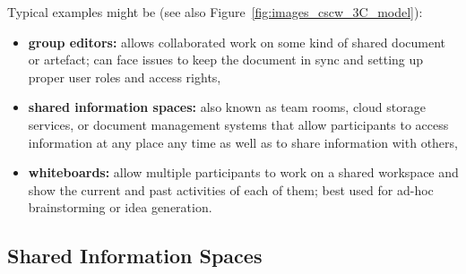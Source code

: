 Typical examples might be (see also Figure~\ref{fig:images_cscw_3C_model}):

\begin{itemize}
  \item \textbf{group editors:} allows collaborated work on some kind of shared document or artefact; can face issues to keep the document in sync and setting up proper user roles and access rights,
  \item \textbf{shared information spaces:} also known as team rooms, cloud storage services, or document management systems that allow participants to access information at any place any time as well as to share information with others,
  \item \textbf{whiteboards:} allow multiple participants to work on a shared workspace and show the current and past activities of each of them; best used for ad-hoc brainstorming or idea generation.
\end{itemize}


\subsection{Shared Information Spaces}
\label{sec:cscw_shared_spaces}


